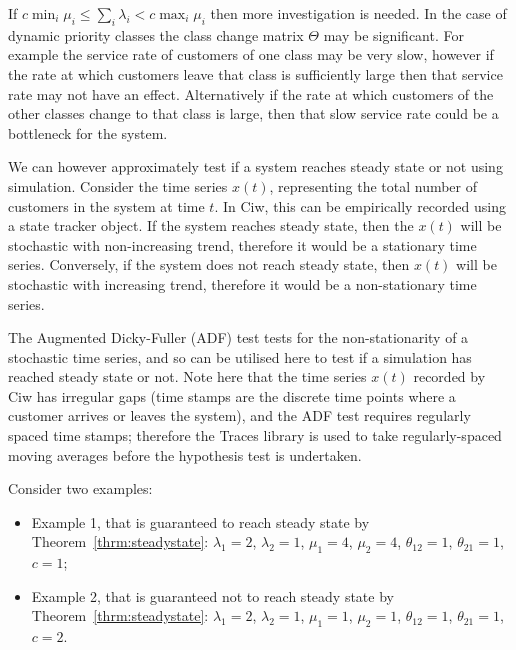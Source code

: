 \documentclass{article}
\begin{document}
If $c \min_i \mu_i \leq \sum_i \lambda_i < c \max_i \mu_i$ then more
investigation is needed. In the case of dynamic priority classes the class
change matrix $\Theta$ may be significant. For example the service rate of
customers of one class may be very slow, however if the rate at which customers
leave that class is sufficiently large then that service rate may not have an
effect. Alternatively if the rate at which customers of the other classes change
to that class is large, then that slow service rate could be a bottleneck for
the system.

We can however approximately test if a system reaches steady state or not using
simulation. Consider the time series $x(t)$, representing the total number of
customers in the system at time $t$. In Ciw, this can be empirically recorded
using a state tracker object. If the system reaches steady state, then the
$x(t)$ will be stochastic with non-increasing trend, therefore it would be a
stationary time series. Conversely, if the system does not reach steady state,
then $x(t)$ will be stochastic with increasing trend, therefore it would be a
non-stationary time series.

The Augmented Dicky-Fuller (ADF) test \cite{dickyfuller79} tests for the
non-stationarity of a stochastic time series, and so can be utilised here to
test if a simulation has reached steady state or not. Note here that the time
series $x(t)$ recorded by Ciw has irregular gaps (time stamps are the discrete
time points where a customer arrives or leaves the system), and the ADF test
requires regularly spaced time stamps; therefore the Traces library
\cite{traces} is used to take regularly-spaced moving averages before the
hypothesis test is undertaken.

Consider two examples:

\begin{itemize}
  \item Example 1, that is guaranteed to reach steady state by
  Theorem~\ref{thrm:steadystate}: $\lambda_1 = 2$, $\lambda_2 = 1$,
  $\mu_1 = 4$, $\mu_2 = 4$, $\theta_{12} = 1$, $\theta_{21} = 1$, $c = 1$;
  \item Example 2, that is guaranteed not to reach steady state by
  Theorem~\ref{thrm:steadystate}: $\lambda_1 = 2$, $\lambda_2 = 1$,
  $\mu_1 = 1$, $\mu_2 = 1$, $\theta_{12} = 1$, $\theta_{21} = 1$, $c = 2$.
\end{itemize}
\end{document}

